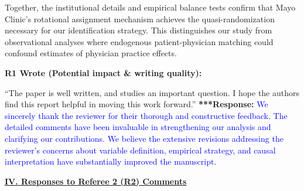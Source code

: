 \documentclass[11pt]{article}
\newenvironment{quote2}
{ \bigskip
\noindent
         \small\em
         \baselineskip=14pt
}
\newcommand{\1}{\hbox{\rm 1\kern-.35em 1}}
\begin{document}
Together, the institutional details and empirical balance tests confirm that Mayo Clinic's rotational assignment mechanism achieves the quasi-randomization necessary for our identification strategy. This distinguishes our study from observational analyses where endogenous patient-physician matching could confound estimates of physician practice effects.

\color{black}



\begin{quote2}
\textbf{R1 Wrote (Potential impact \& writing quality):}

\noindent``The paper is well written, and studies an important question. I hope the authors find this report helpful in moving this work forward.” 
\end{quote2}

\noindent\textbf{***Response:} \textcolor{blue}{We sincerely thank the reviewer for their thorough and constructive feedback. The detailed comments have been invaluable in strengthening our analysis and clarifying our contributions. We believe the extensive revisions addressing the reviewer's concerns about variable definition, empirical strategy, and causal interpretation have substantially improved the manuscript.}



\clearpage


\pagestyle{fancy}
\fancyhead{}
\renewcommand{\headrulewidth}{0pt}

\noindent\underline{\textbf{IV. Responses to Referee 2 (R2) Comments}}

\end{document}
